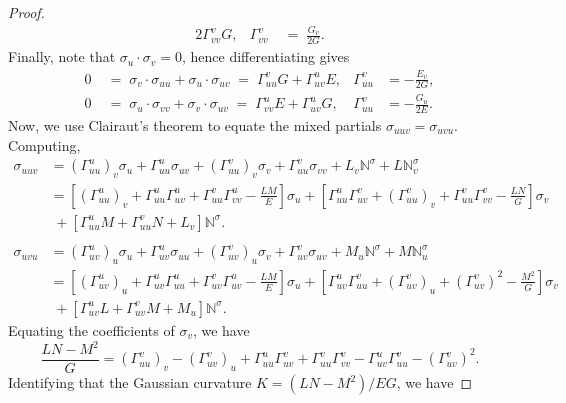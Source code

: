 \documentclass[11pt]{article}
\newcommand{\N}{\mathbb{N}}
\theoremstyle{definition}
\theoremstyle{remark}
\numberwithin{equation}{section}
\begin{document}
\begin{proof}
\begin{align*}
            2\Gamma_{vv}^v G, &
            \Gamma_{vv}^v \;&=\; \frac{G_v}{2G}.
        \end{align*} Finally, note that $\sigma_u\cdot\sigma_v = 0$, hence
        differentiating gives \begin{align*}
            0 \;&=\; \sigma_v\cdot \sigma_{uu} + \sigma_u\cdot\sigma_{uv} \;=\;
            \Gamma_{uu}^v G + \Gamma_{uv}^u E, &
            \Gamma_{uu}^v &= -\frac{E_v}{2G}, \\
            0 \;&=\; \sigma_u\cdot \sigma_{vv} + \sigma_v\cdot\sigma_{uv} \;=\;
            \Gamma_{vv}^u E + \Gamma_{uv}^u G, &
            \Gamma_{uu}^v &= -\frac{G_u}{2E}.
        \end{align*}
        Now, we use Clairaut's theorem to equate the mixed partials $\sigma_{uuv} =
        \sigma_{uvu}$. Computing, \begin{align*}
            \sigma_{uuv} &= (\Gamma_{uu}^u)_v\sigma_u +
            \Gamma_{uu}^u\sigma_{uv} + (\Gamma_{uu}^v)_v \sigma_v +
            \Gamma_{uu}^v\sigma_{vv} + L_v\N^\sigma + L\N^\sigma_v \\
            &= \left[(\Gamma_{uu}^u)_v + \Gamma_{uu}^u\Gamma_{uv}^u +
            \Gamma_{uu}^v\Gamma_{vv}^u - \frac{LM}{E}\right]\sigma_u
            + \left[\Gamma_{uu}^u\Gamma_{uv}^v + (\Gamma_{uu}^v)_v +
            \Gamma_{uu}^v\Gamma_{vv}^v - \frac{LN}{G}\right]\sigma_v \\
            &\;+ \left[\Gamma_{uu}^u M + \Gamma_{uu}^v N + L_v\right]\N^\sigma.
            \\\\
            \sigma_{uvu} &= (\Gamma_{uv}^u)_u\sigma_u +
            \Gamma_{uv}^u\sigma_{uu} + (\Gamma_{uv}^v)_u\sigma_v +
            \Gamma_{uv}^v\sigma_{uv} + M_u\N^\sigma + M\N^\sigma_u \\
            &= \left[(\Gamma_{uv}^u)_u + \Gamma_{uv}^u\Gamma_{uu}^u +
            \Gamma_{uv}^v\Gamma_{uv}^u - \frac{LM}{E}\right]\sigma_u
            + \left[\Gamma_{uv}^u\Gamma_{uu}^v + (\Gamma_{uv}^v)_u +
            (\Gamma_{uv}^v)^2 - \frac{M^2}{G}\right]\sigma_v \\
            &\; + \left[\Gamma_{uv}^uL + \Gamma_{uv}^v M + M_u\right]\N^\sigma.
        \end{align*}
        Equating the coefficients of $\sigma_v$, we have \[
            \frac{LN - M^2}{G} = (\Gamma_{uu}^v)_v - (\Gamma_{uv}^v)_u +
            \Gamma_{uu}^u\Gamma_{uv}^v + \Gamma_{uu}^v\Gamma_{vv}^v -
            \Gamma_{uv}^u\Gamma_{uu}^v - (\Gamma_{uv}^v)^2.
        \] Identifying that the Gaussian curvature $K = (LN - M^2) / EG$, we have

\end{proof}
\end{document}
